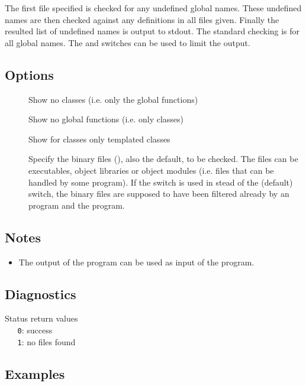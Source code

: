 The first file specified is checked for any undefined global names. These
undefined names are then checked against any definitions in all files
given. Finally the resulted list of undefined names is output to stdout.
The standard checking is for all global names. The   and
 switches can be used to limit the output.

\subsection*{Options}

\begin{description}
\item[]
   Show no classes (i.e. only the global functions)
\item[]
   Show no global functions (i.e. only classes)
\item[]
   Show for classes only templated classes
\item[]
   Specify the binary files (), also the default, to be checked. The
   files can be executables, object libraries or object modules (i.e. files
   that can be handled by some  program). If the  switch is
   used in stead of the (default)  switch, the binary files are
   supposed to have been filtered already by an  program and the
    program.
\end{description}

\subsection*{Notes}

\begin{itemize}
\item
   The output of the program can be used as input of the 
   program. 
\end{itemize}

\subsection*{Diagnostics}

Status return values
\\ \verb+   0+: success
\\ \verb+   1+: no files found

\subsection*{Examples}

